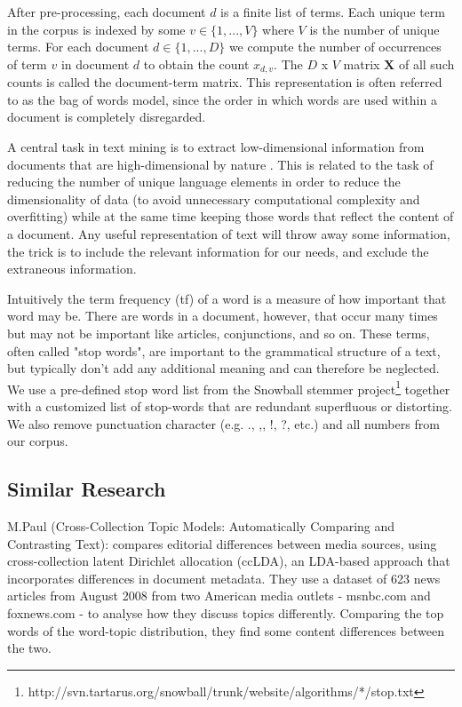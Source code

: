 \documentclass[12pt,a4paper,notitlepage]{article}
\begin{document}
After pre-processing, each document $d$ is a finite list of terms. Each unique term in the corpus is indexed by some $v \in \lbrace 1,...,V \rbrace$ where $V$ is the number of unique terms. For each document $d \in \lbrace 1,...,D \rbrace$ we compute the number of occurrences of term $v$ in document $d$ to obtain the count $x_{d,v}$. The $D$ x $V$ matrix $\boldsymbol{X}$ of all such counts is called the document-term matrix. This representation is often referred to as the bag of words model, since the order in which words are used within a document is completely disregarded. 

A central task in text mining is to extract low-dimensional information from documents that are high-dimensional by nature \citep{bholat_text_2015}. This is related to the task of reducing the number of unique language elements in order to reduce the dimensionality of data (to avoid unnecessary computational complexity and overfitting) while at the same time keeping those words that reflect the content of a document. Any useful representation of text will throw away some information, the trick is to include the relevant information for our needs, and exclude the extraneous information. 

Intuitively the term frequency (tf) of a word is a measure of how important that word may be. There are words in a document, however, that occur many times but may not be important like articles, conjunctions, and so on. These terms, often called "stop words", are important to the grammatical structure of a text, but typically don't add any additional meaning and can therefore be neglected. We use a pre-defined stop word list from the Snowball stemmer project\footnote{http://svn.tartarus.org/snowball/trunk/website/algorithms/*/stop.txt} together with a customized list of stop-words that are redundant superfluous or distorting. We also remove punctuation character (e.g. ., ,, !, ?, etc.) and all numbers from our corpus.  

\subsection{Similar Research}

M.Paul (Cross-Collection Topic Models: Automatically Comparing and Contrasting Text): compares editorial differences between media sources, using cross-collection latent Dirichlet allocation (ccLDA), an LDA-based approach that incorporates differences in document metadata. They use a dataset of 623 news articles from August 2008 from two American media outlets - msnbc.com and foxnews.com - to analyse how they discuss topics differently. Comparing the top words of the word-topic distribution, they find some content differences between the two. 
\end{document}
